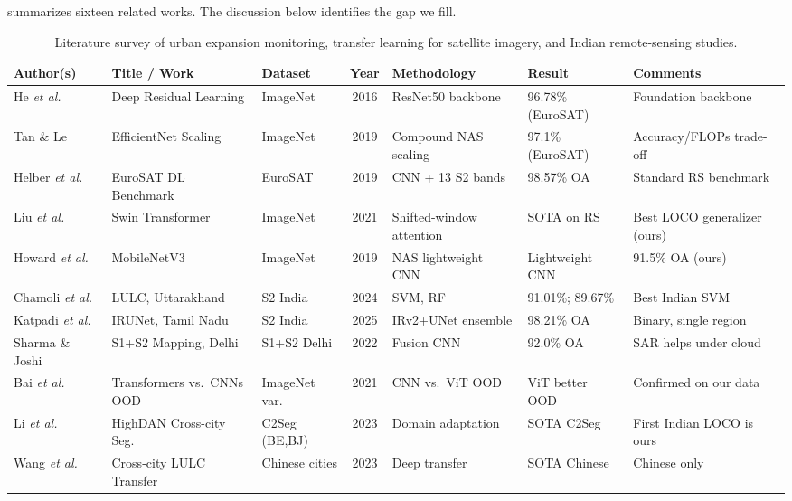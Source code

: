 \documentclass[conference]{IEEEtran}
\begin{document}
 summarizes sixteen related works. The discussion below identifies the gap we fill.

\begin{table}[t]
\centering
\caption{Literature survey of urban expansion monitoring, transfer learning for satellite imagery, and Indian remote-sensing studies.}
\label{tab:litreview}
\renewcommand{\arraystretch}{1.05}
\scriptsize
\begin{tabular}{p{2.1cm} p{3.5cm} p{1.9cm} c p{2.9cm} p{2.0cm} p{1.8cm}}
\toprule
\textbf{Author(s)} & \textbf{Title / Work} & \textbf{Dataset} & \textbf{Year} & \textbf{Methodology} & \textbf{Result} & \textbf{Comments}\\
\midrule
He \emph{et al.}~\cite{he2016} & Deep Residual Learning & ImageNet & 2016 & ResNet50 backbone & 96.78\% (EuroSAT) & Foundation backbone\\
Tan \& Le~\cite{tan2019} & EfficientNet Scaling & ImageNet & 2019 & Compound NAS scaling & 97.1\% (EuroSAT) & Accuracy/FLOPs trade-off\\
Helber \emph{et al.}~\cite{helber2019} & EuroSAT DL Benchmark & EuroSAT & 2019 & CNN + 13 S2 bands & 98.57\% OA & Standard RS benchmark\\
Liu \emph{et al.}~\cite{liu2021} & Swin Transformer & ImageNet & 2021 & Shifted-window attention & SOTA on RS & Best LOCO generalizer (ours)\\
Howard \emph{et al.}~\cite{howard2019} & MobileNetV3 & ImageNet & 2019 & NAS lightweight CNN & Lightweight CNN & 91.5\% OA (ours)\\
Chamoli \emph{et al.}~\cite{chamoli2024} & LULC, Uttarakhand & S2 India & 2024 & SVM, RF & 91.01\%; 89.67\% & Best Indian SVM\\
Katpadi \emph{et al.}~\cite{katpadi2025} & IRUNet, Tamil Nadu & S2 India & 2025 & IRv2+UNet ensemble & 98.21\% OA & Binary, single region\\
Sharma \& Joshi~\cite{s1s2fusion2022} & S1+S2 Mapping, Delhi & S1+S2 Delhi & 2022 & Fusion CNN & 92.0\% OA & SAR helps under cloud\\
Bai \emph{et al.}~\cite{bai2021} & Transformers vs.\ CNNs OOD & ImageNet var.\ & 2021 & CNN vs.\ ViT OOD & ViT better OOD & Confirmed on our data\\
Li \emph{et al.}~\cite{li2023} & HighDAN Cross-city Seg. & C2Seg (BE,BJ) & 2023 & Domain adaptation & SOTA C2Seg & First Indian LOCO is ours\\
Wang \emph{et al.}~\cite{wang2023} & Cross-city LULC Transfer & Chinese cities & 2023 & Deep transfer & SOTA Chinese & Chinese only\\

\end{tabular}
\end{table}
\end{document}
